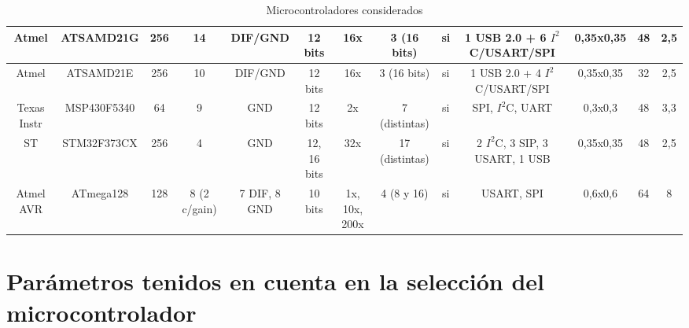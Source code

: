 \begin{landscape}
\begin{table}[!]
\begin{flushleft}
{\begin{tabular}{|c|c|c|c|c|c|c|c|c|c|c|c|c|}
\hline
 Atmel & ATSAMD21G &    256 &     14 & DIF/GND & 12 bits &    16x & 3 (16 bits) &     si & 1 USB 2.0 + 6 $I^{2}$C/USART/SPI & 0,35x0,35 &     48 &    2,5 \\
\hline
 Atmel & ATSAMD21E &    256 &     10 & DIF/GND & 12 bits &    16x & 3 (16 bits) &     si & 1 USB 2.0 + 4 $I^{2}$C/USART/SPI & 0,35x0,35 &     32 &    2,5 \\
\hline
Texas Instr & MSP430F5340 &     64 &      9 &    GND & 12 bits &     2x & 7 (distintas) &     si & SPI, $I^{2}$C, UART & 0,3x0,3 &     48 &    3,3 \\
\hline
    ST & STM32F373CX &    256 &      4 &    GND & 12, 16 bits &    32x & 17 (distintas) &     si & 2 $I^{2}$C, 3 SIP, 3 USART, 1 USB & 0,35x0,35 &     48 &    2,5 \\
\hline
Atmel AVR & ATmega128 &    128 & 8 (2 c/gain) & 7 DIF, 8 GND & 10 bits & 1x, 10x, 200x & 4 (8 y 16) &     si & USART, SPI & 0,6x0,6 &     64 &      8 \\
\hline
\end{tabular}



}
\end{flushleft}
  \caption{Microcontroladores considerados}\label{tabla_micros}
\end{table}

\end{landscape}

\section{Parámetros tenidos en cuenta en la selección del microcontrolador} %
\label{sub:parametros_tenidos_en_cuenta_en_la_seleccion_del_microcontrolador}

